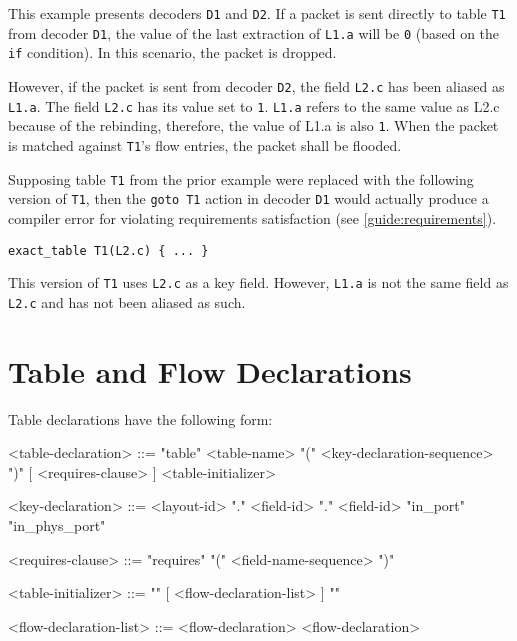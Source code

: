 This example presents decoders \texttt{D1} and \texttt{D2}. If a packet is sent directly to table \texttt{T1} from decoder \texttt{D1}, the value of the last extraction of \texttt{L1.a} will be \texttt{0} (based on the \texttt{if} condition). In this scenario, the packet is dropped. 

However, if the packet is sent from decoder \texttt{D2}, the field \texttt{L2.c} has been aliased as \texttt{L1.a}. The field \texttt{L2.c} has its value set to \texttt{1}. \texttt{L1.a} refers to the same value as L2.c because of the rebinding, therefore, the value of L1.a is also \texttt{1}.
When the packet is matched against \texttt{T1}'s flow entries, the packet shall be flooded.

Supposing table \texttt{T1} from the prior example were replaced with the following version of \texttt{T1}, then the \texttt{goto T1} action in decoder \texttt{D1} would actually produce a compiler error for violating requirements satisfaction (see \ref{guide:requirements}). 

\begin{minip}
\begin{lstlisting}
exact_table T1(L2.c) { ... }
\end{lstlisting}
\end{minip}

This version of \texttt{T1} uses \texttt{L2.c} as a key field. However, \texttt{L1.a} is not the same field as \texttt{L2.c} and has not been aliased as such.

\section{Table and Flow Declarations} \label{guide:tables}

Table declarations have the following form:

\begin{minip}
\begin{grammar}
<table-declaration> ::=
"table" <table-name> "(" <key-declaration-sequence> ")"
[ <requires-clause> ] <table-initializer>

<key-declaration> ::=
<layout-id> "." <field-id>
 "." <field-id>
\alt "in_port"
\alt "in\_phys\_port"

<requires-clause> ::=
"requires" "(" <field-name-sequence> ")"

<table-initializer> ::= "{" [ <flow-declaration-list> ] "}"

<flow-declaration-list> ::= <flow-declaration>
 <flow-declaration>
\end{grammar}
\end{minip}

